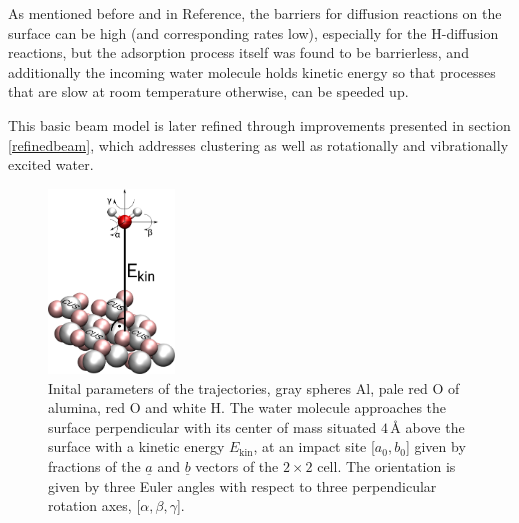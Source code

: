 \documentclass[11pt,DIV=13,BCOR=5mm,a4paper,headinclude]{scrbook}
\renewcommand{\vec}[1]{\underline{#1}}
\begin{document}
As mentioned before and in Reference\cite{WirthJPCC2012}, the barriers for diffusion reactions on the surface can be high (and corresponding rates low), especially for the H-diffusion reactions, but the adsorption process itself was found to be barrierless, and additionally the incoming water molecule holds kinetic energy so that processes that are slow at room temperature otherwise, can be speeded up.


This basic beam model is later refined through improvements presented in section \ref{refinedbeam}, which addresses clustering as well as rotationally and vibrationally excited water.

\begin{figure}[!ht]
 \centering
\includegraphics[width=0.3\textwidth]{figures/0001/perspective+h2o_new.png}
 \caption{Inital parameters of the trajectories, gray spheres Al, pale red O of alumina, red O and white H.
The water molecule approaches the surface perpendicular with its center of mass situated $4\,$\AA{} above the surface with a kinetic energy $E_\textrm{kin}$, at an impact site [$a_0,b_0$] given by fractions of the $\vec{a}$ and $\vec{b}$ vectors of the $2\times 2$ cell.
The orientation is given by three Euler angles with respect to three perpendicular rotation axes, [$\alpha,\beta,\gamma$].}
        \label{abb:initial_parameters}
 \end{figure}
 
\end{document}
